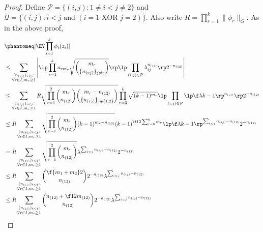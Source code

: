 \documentclass[main.tex]{subfiles}
\begin{document}
\begin{proof}
\newcommand{\suchthat}{\mathrm{s.t.}}
Define $\mathcal P = \{(i,j): 1\ne i<j \ne 2\}$ and $\mathcal Q = \{(i,j): i<j \text{ and } (\text{$i=1$ XOR $j=2$})\}$.
Also write $R = \prod_{r=1}^k \|\phi_r\|_G.$
As in the above proof,
\begin{align*}
    &\phantomeq
      |\EV \prod_{i=1}^k \phi_i(z_i)|\\
    &\le
        \sum_{\substack{(n_{(ij)})_{i<j}:\\\forall r \in I, m_r \ge 1}}
        \left|
        \lp \prod_{r=1}^k a_{r m_r} \sqrt{\binom{m_r}{\{n_{(rj)}\}_{j \ne r}}} \rp 
        \lp \prod_{(i,j) \in \mathcal P} \lambda_{ij}^{n_{(ij)}}
            \rp
        2^{-n_{(12)}}
        \right|
        \\
    &\le
        \sum_{\substack{(n_{(ij)})_{i<j}:\\\forall r \in I, m_r \ge 1}}
        R
        \sqrt{\prod_{r=1}^2 \binom{m_r}{n_{(12)}}
                    \binom{m_r - n_{(12)}}{\{n_{(rj)}\}_{j \not \in \{1,2\}}}
            }
        \prod_{r=3}^k \sqrt{(k-1)^{m_r}}
        \lp \prod_{(i,j) \in \mathcal P} \lp \f \lambda{k-1} \rp^{n_{(ij)}}
            \rp
        2^{-n_{(12)}}
        \\
    &\le
        R
        \sum_{\substack{(n_{(ij)})_{i<j}:\\\forall r \in I, m_r \ge 1}}
        \sqrt{\prod_{r=1}^2 \binom{m_r}{n_{(12)}}
                    (k-1)^{m_r - n_{(12)}}
            }
        (k-1)^{\f 1 2 \sum_{r=3}^k m_r}
         \lp \f \lambda{k-1} \rp^{\sum_{i<j} n_{(ij)} - n_{(12)}}
        2^{-n_{(12)}}
        \\
    &=
        R
        \sum_{\substack{(n_{(ij)})_{i<j}:\\\forall r \in I, m_r \ge 1}}
        \sqrt{\prod_{r=1}^2 \binom{m_r}{n_{(12)}}
            }
         \lambda^{\sum_{i<j} n_{(ij)} - n_{(12)}}
         2^{-n_{(12)}}
        \\
    &\le
        R
        \sum_{\substack{(n_{(ij)})_{i<j}:\\\forall r \in I, m_r \ge 1}}
        \binom{\f{m_1+m_2}2}{n_{(12)}}
         2^{-n_{(12)}}
         \lambda^{\sum_{i<j} n_{(ij)} - n_{(12)}}
        \\
    &\le
        R
        \sum_{\substack{(n_{(ij)})_{i<j}:\\\forall r \in I, m_r \ge 1}}
        \binom{n_{(12)} + \f 1 2 m_{(12)}}{n_{(12)}}
         2^{-n_{(12)}}
         \lambda^{\sum_{i<j} n_{(ij)} - n_{(12)}}
        \\

\end{align*}
\end{proof}
\end{document}
